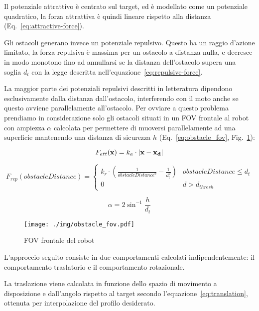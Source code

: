 \documentclass[10pt]{beamer}
\begin{document}
	Il potenziale attrattivo è centrato sul target, ed è modellato come un
	potenziale quadratico, la forza attrattiva è quindi lineare rispetto alla
	distanza (Eq.~\ref{eq:attractive-force}).

	Gli ostacoli generano invece un potenziale repulsivo. Questo ha un raggio
	d'azione limitato, la forza repulsiva è massima per un ostacolo a distanza
	nulla, e decresce in modo monotono fino ad annullarsi se la distanza
	dell'ostacolo supera una soglia $d_t$ con la legge descritta
	nell'equazione~\ref{eq:repulsive-force}.

	La maggior parte dei potenziali repulsivi descritti in letteratura
	dipendono esclusivamente dalla distanza dall'ostacolo, interferendo con il
	moto anche se questo avviene parallelamente all'ostacolo. Per ovviare a
	questo problema prendiamo in considerazione solo gli ostacoli situati in un
	FOV frontale al robot con ampiezza $ \alpha  $ calcolata per permettere di
	muoversi parallelamente ad una superficie mantenendo una distanza di
	sicurezza $ h $ (Eq.~\ref{eq:obstacle_fov}, Fig.~\ref{fig:obstacle_fov}): 


	\begin{equation}\label{eq:attractive-force}
		F_{att}( \textbf{x}) = k_a\cdot \left| {\bf x - x_d} \right| 
	\end{equation}

	\begin{equation}\label{eq:repulsive-force}
		F_{rep}(obstacleDistance) = \begin{cases}
			k_r \cdot \left(
				\frac{1}{obstacleDistance^2}-
				\frac{1}{d_t^2}
			\right)  & obstacleDistance \leq d_{t} \\
			0 & d > d_{thresh}
		\end{cases}
	\end{equation}

	\begin{equation}\label{eq:obstacle_fov}
		\alpha = {2}\sin^{-1}{\frac{h}{d_t}}
	\end{equation}

	\begin{figure}[H]
		\centering
		\texttt{[image: ./img/obstacle\_fov.pdf]}
		\caption{FOV frontale del robot}
		\label{fig:obstacle_fov}
	\end{figure}

	L'approccio seguito consiste in due comportamenti calcolati
	indipendentemente: il comportamento traslatorio e il comportamento
	rotazionale.

	La traslazione viene calcolata in funzione dello spazio di movimento a
	disposizione e dall'angolo rispetto al target secondo
	l'equazione~\ref{eq:translation}, ottenuta per interpolazione del profilo
	desiderato.
\end{document}
